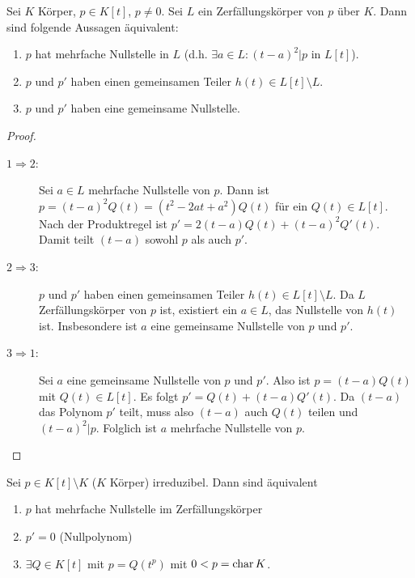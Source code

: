 \documentclass[12pt,a4paper]{scrartcl}
\begin{document}
\begin{satz}
	Sei $K$ Körper, $p\in K[t]$, $p\neq 0$. Sei $L$ ein Zerfällungskörper von $p$ über $K$. Dann sind folgende Aussagen äquivalent:
	\begin{enumerate}
		\item $p$ hat mehrfache Nullstelle in $L$ (d.h. $\exists a\in L: (t-a)^2|p$ in $L[t]$).
		\item $p$ und $p'$ haben einen gemeinsamen Teiler $h(t)\in L[t]\setminus L$.
		\item $p$ und $p'$ haben eine gemeinsame Nullstelle.
	\end{enumerate}
\end{satz}
\begin{proof}
	\leavevmode
	\begin{description}
		\item[$1\Rightarrow 2$:] Sei $a\in L$ mehrfache Nullstelle von $p$. Dann ist $p = (t-a)^2Q(t) = (t^2-2at+a^2)Q(t)$ für ein $Q(t)\in L[t]$. Nach der Produktregel ist $p' = 2(t-a)Q(t) + (t-a)^2Q'(t)$. Damit teilt $(t-a)$ sowohl $p$ als auch $p'$.
		\item[$2\Rightarrow 3$:] $p$ und $p'$ haben einen gemeinsamen Teiler $h(t)\in L[t]\setminus L$. Da $L$ Zerfällungskörper von $p$ ist, existiert ein $a\in L$, das Nullstelle von $h(t)$ ist. Insbesondere ist $a$ eine gemeinsame Nullstelle von $p$ und $p'$.
		\item[$3\Rightarrow 1$:] Sei $a$ eine gemeinsame Nullstelle von $p$ und $p'$. Also ist $p = (t-a)Q(t)$ mit $Q(t)\in L[t]$. Es folgt $p' = Q(t) + (t-a)Q'(t)$. Da $(t-a)$ das Polynom $p'$ teilt, muss also $(t-a)$ auch $Q(t)$ teilen und $(t-a)^2|p$. Folglich ist $a$ mehrfache Nullstelle von $p$.
	\end{description}
\end{proof}
\begin{kor}
	Sei $p\in K[t]\setminus K$ ($K$ Körper) irreduzibel. Dann sind äquivalent\begin{enumerate}
		\item $p$ hat mehrfache Nullstelle im Zerfällungskörper
		\item $p' = 0$ (Nullpolynom)
		\item $\exists Q\in K[t]$ mit $p = Q(t^p)$ mit $0<p = \operatorname{char} K$.
	\end{enumerate}
\end{kor}
\end{document}
